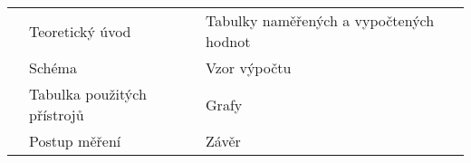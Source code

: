 \begin{tabular}{lll}
  \hspace*{2.5cm} & Teoretický úvod             & Tabulky naměřených a vypočtených hodnot \\
  \hspace*{2.5cm} & Schéma                      & Vzor výpočtu                            \\
  \hspace*{2.5cm} & Tabulka použitých přístrojů & Grafy                                   \\
  \hspace*{2.5cm} & Postup měření               & Závěr                                   \\
\end{tabular}
